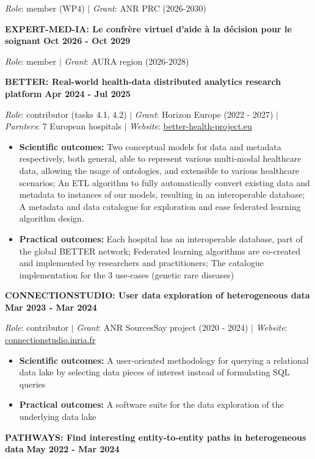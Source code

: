 \documentclass{article}
\begin{document}
\noindent\textit{Role}: member (WP4) $|$ \textit{Grant}: ANR PRC (2026-2030)

\vspace{1em}\noindent\textbf{EXPERT-MED-IA: Le confrère virtuel d'aide à la décision pour le soignant} \hfill \textbf{Oct 2026 - Oct 2029}


\noindent\textit{Role}: member $|$ \textit{Grant}: AURA region (2026-2028)

\vspace{1em}\noindent\textbf{BETTER: Real-world health-data distributed analytics research platform} \hfill \textbf{Apr 2024 - Jul 2025}


\noindent\textit{Role}: contributor (tasks 4.1, 4.2) $|$ \textit{Grant}: Horizon Europe (2022 - 2027) $|$ \textit{Parnters}: 7 European hospitals $|$ \textit{Website}: \href{https://better-health-project.eu}{better-health-project.eu}

\begin{itemize}
\item \textbf{Scientific outcomes:} Two conceptual models for data and metadata respectively, both general, able to represent various multi-modal healthcare data, allowing the usage of ontologies, and extensible to various healthcare scenarios; An ETL algorithm to fully automatically convert existing data and metadata to instances of our models, resulting in an interoperable database; A metadata and data catalogue for exploration and ease federated learning algorithm design.
\item \textbf{Practical outcomes:} Each hospital has an interoperable database, part of the global BETTER network; Federated learning algorithms are co-created and implemented by researchers and practitioners; The catalogue implementation for the 3 use-cases (genetic rare diseases)
\end{itemize}
\vspace{1em}\noindent\textbf{CONNECTIONSTUDIO: User data exploration of heterogeneous data} \hfill \textbf{Mar 2023 - Mar 2024}


\noindent\textit{Role}: contributor $|$ \textit{Grant}: ANR SourcesSay project (2020 - 2024) $|$ \textit{Website}: \href{https://connectionstudio.inria.fr}{connectionstudio.inria.fr}

\begin{itemize}
\item \textbf{Scientific outcomes:} A user-oriented methodology for querying a relational data lake by selecting data pieces of interest instead of formulating SQL queries
\item \textbf{Practical outcomes:} A software suite for the data exploration of the underlying data lake
\end{itemize}
\vspace{1em}\noindent\textbf{PATHWAYS: Find interesting entity-to-entity paths in heterogeneous data} \hfill \textbf{May 2022 - Mar 2024}
\end{document}
